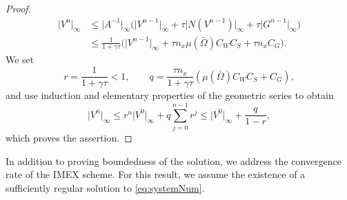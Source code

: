 \documentclass[a4paper,final]{siamart190516}
\newcommand{\Nb}{\mathbb{N}}
\begin{document}
\begin{proof}
\[\begin{aligned}
    \vert V^n \vert_\infty 
        & \leq \vert A^{-1} \vert_\infty 
	  \Big(
	      \vert V^{n-1} \vert_\infty 
	    + \tau \vert N(V^{n-1}) \vert_\infty
	    + \tau \vert G^{n-1} \vert_\infty 
	  \Big) \\
	& \leq \frac{1}{1+\gamma \tau}
	  \Big(
	      \vert V^{n-1} \vert_\infty 
	      + \tau n_x \mu(\bar\Omega) C_W C_S 
	      + \tau n_x C_G
	  \Big).
    \end{aligned}
  \]
  We set
  \[
    r = \frac{1}{1+\gamma \tau} <1, \qquad 
    q = \frac{\tau n_x}{1 + \gamma \tau}
      ( \mu(\bar\Omega) C_W C_S + C_G),
  \]
  and use induction and elementary properties of the geometric series to obtain
  \[
    \vert V^n \vert_\infty \leq r^n \vert V^0 \vert_\infty + q \sum_{j =0}^{n-1} r^j
      \leq \vert V^0 \vert_\infty + \frac{q}{1-r},
  \]
  which proves the assertion.
\end{proof}

In addition to proving boundedness of the solution, we address the
convergence rate of the IMEX scheme. For this result, we assume the existence of a
sufficiently regular solution to \eqref{eq:systemNum}.
\end{document}
